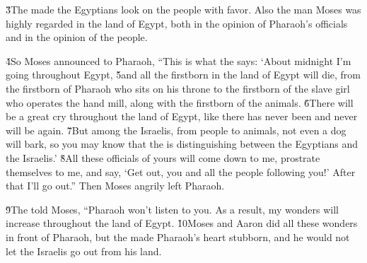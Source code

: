 \v{3}The  made the Egyptians look on the people with favor. Also the man Moses was highly regarded in the land of Egypt, both in the opinion of Pharaoh's officials and in the opinion of the people.

\v{4}So Moses announced to Pharaoh, ``This is what the  says: `About midnight I'm going throughout Egypt, \v{5}and all the firstborn in the land of Egypt will die, from the firstborn of Pharaoh who sits on his throne to the firstborn of the slave girl who operates the hand mill, along with the firstborn of the animals. \v{6}There will be a great cry throughout the land of Egypt, like there has never been and never will be again. \v{7}But among the Israelis, from people to animals, not even a dog will bark, so you may know that the  is distinguishing between the Egyptians and the Israelis.' \v{8}All these officials of yours will come down to me, prostrate themselves to me, and say, `Get out, you and all the people following you!' After that I'll go out.'' Then Moses angrily left Pharaoh.

\v{9}The  told Moses, ``Pharaoh won't listen to you. As a result, my wonders will increase throughout the land of Egypt. \v{10}Moses and Aaron did all these wonders in front of Pharaoh, but the  made Pharaoh's heart stubborn, and he would not let the Israelis go out from his land.

